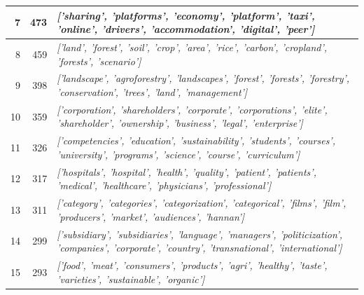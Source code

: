 \documentclass[12pt]{article}
\begin{document}
\begin{landscape}
\begin{table}[]
\begin{tabular}{rrl}
\multicolumn{1}{|r|}{7}              & \multicolumn{1}{r|}{473}            & \multicolumn{1}{l|}{\textit{{[}'sharing', 'platforms', 'economy', 'platform', 'taxi', 'online', 'drivers', 'accommodation', 'digital', 'peer'{]}}}                                   \\ \hline
\multicolumn{1}{|r|}{8}              & \multicolumn{1}{r|}{459}            & \multicolumn{1}{l|}{\textit{{[}'land', 'forest', 'soil', 'crop', 'area', 'rice', 'carbon', 'cropland', 'forests', 'scenario'{]}}}                                                    \\ \hline
\multicolumn{1}{|r|}{9}              & \multicolumn{1}{r|}{398}            & \multicolumn{1}{l|}{\textit{{[}'landscape', 'agroforestry', 'landscapes', 'forest', 'forests', 'forestry', 'conservation', 'trees', 'land', 'management'{]}}}                        \\ \hline
\multicolumn{1}{|r|}{10}             & \multicolumn{1}{r|}{359}            & \multicolumn{1}{l|}{\textit{{[}'corporation', 'shareholders', 'corporate', 'corporations', 'elite', 'shareholder', 'ownership', 'business', 'legal', 'enterprise'{]}}}               \\ \hline
\multicolumn{1}{|r|}{11}             & \multicolumn{1}{r|}{326}            & \multicolumn{1}{l|}{\textit{{[}'competencies', 'education', 'sustainability', 'students', 'courses', 'university', 'programs', 'science', 'course', 'curriculum'{]}}}                \\ \hline
\multicolumn{1}{|r|}{12}             & \multicolumn{1}{r|}{317}            & \multicolumn{1}{l|}{\textit{{[}'hospitals', 'hospital', 'health', 'quality', 'patient', 'patients', 'medical', 'healthcare', 'physicians', 'professional'{]}}}                       \\ \hline
\multicolumn{1}{|r|}{13}             & \multicolumn{1}{r|}{311}            & \multicolumn{1}{l|}{\textit{{[}'category', 'categories', 'categorization', 'categorical', 'films', 'film', 'producers', 'market', 'audiences', 'hannan'{]}}}                         \\ \hline
\multicolumn{1}{|r|}{14}             & \multicolumn{1}{r|}{299}            & \multicolumn{1}{l|}{\textit{{[}'subsidiary', 'subsidiaries', 'language', 'managers', 'politicization', 'companies', 'corporate', 'country', 'transnational', 'international'{]}}}    \\ \hline
\multicolumn{1}{|r|}{15}             & \multicolumn{1}{r|}{293}            & \multicolumn{1}{l|}{\textit{{[}'food', 'meat', 'consumers', 'products', 'agri', 'healthy', 'taste', 'varieties', 'sustainable', 'organic'{]}}}                                       \\ \hline

\end{tabular}
\end{table}
\end{landscape}
\end{document}
